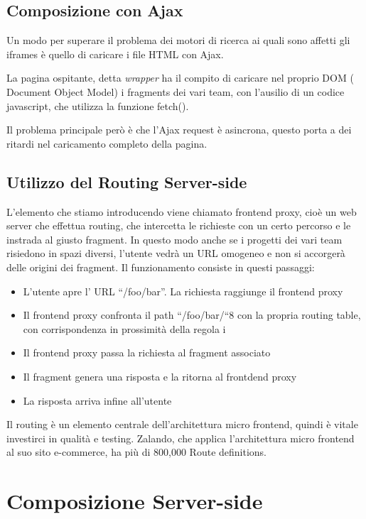 \subsection*{Composizione con Ajax}
Un modo per superare il problema dei motori di ricerca ai quali sono affetti gli iframes è quello di 
caricare i file HTML con Ajax.

La pagina ospitante, detta \emph{wrapper} ha il compito di caricare nel proprio DOM ( Document Object Model) i fragments dei vari 
team, con l'ausilio di un codice javascript, che utilizza la funzione fetch().

Il problema principale però è che l’Ajax request è asincrona, 
questo porta a dei ritardi nel caricamento completo della pagina.

\subsection*{Utilizzo del Routing Server-side}
L’elemento che stiamo introducendo viene chiamato frontend proxy, cioè un web server che effettua routing,
 che intercetta le richieste con un certo percorso e le instrada al giusto fragment. In questo modo anche se
  i progetti dei vari team risiedono in spazi diversi, l’utente vedrà un URL omogeneo e non si accorgerà delle origini dei fragment.
Il funzionamento consiste in questi passaggi:
\begin{itemize}
    \item L’utente apre l’ URL “/foo/bar”. La richiesta raggiunge il frontend proxy
    \item Il frontend proxy confronta il path “/foo/bar/“8 con la propria routing table, con corrispondenza in prossimità della regola i
    \item  Il frontend proxy passa la richiesta al fragment associato
    \item Il fragment genera una risposta e la ritorna al frontdend proxy
    \item La risposta arriva infine all’utente
\end{itemize}





Il routing è un elemento centrale dell’architettura micro frontend, quindi è vitale investirci in qualità e testing.
Zalando, che applica l’architettura micro frontend al suo sito e-commerce, ha più di 800,000 Route definitions.

\pagebreak

\section*{Composizione Server-side}

